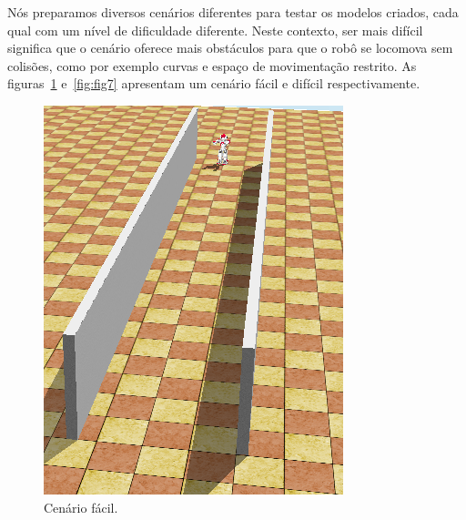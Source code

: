 \documentclass[twoside,conference,a4paper]{IEEEtran}
\begin{document}
Nós preparamos diversos cenários diferentes para testar os modelos criados, cada qual com um nível de dificuldade diferente. Neste contexto, ser mais difícil significa que o cenário oferece mais obstáculos para que o robô se locomova sem colisões, como por exemplo curvas e espaço de movimentação restrito. As figuras~\ref{fig:fig6} e~\ref{fig:fig7} apresentam um cenário fácil e difícil respectivamente.

\begin{figure}[ht]
\centering
\includegraphics[width=1\hsize]{figuras/corredor-facil-2.png}
\caption{Cenário fácil.}
\label{fig:fig6}
\end{figure}
\end{document}

